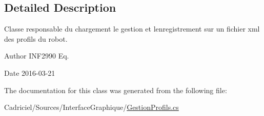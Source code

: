 \subsection{Detailed Description}
Classe responsable du chargement le gestion et l\textquotesingle{}enregistrement sur un fichier xml des profils du robot. 

\begin{DoxyAuthor}{Author}
I\+N\+F2990 Eq. 
\end{DoxyAuthor}
\begin{DoxyDate}{Date}
2016-\/03-\/21 
\end{DoxyDate}


The documentation for this class was generated from the following file\+:\begin{DoxyCompactItemize}
\item 
Cadriciel/\+Sources/\+Interface\+Graphique/\hyperlink{_gestion_profils_8cs}{Gestion\+Profils.\+cs}\end{DoxyCompactItemize}
